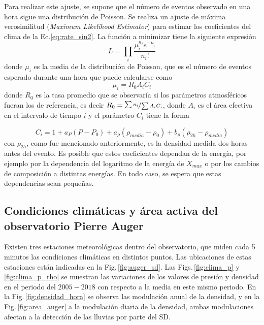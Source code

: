 Para realizar este ajuste, se supone que el número de eventos observado en una hora sigue una distribución de Poisson. Se realiza un ajuste de máxima verosimilitud (\emph{Maximum Likelihood Estimator}) para estimar los coeficientes del clima de la Ec.\ref{eq:rate_sin2}. La función a minimizar tiene la siguiente expresión 
\begin{equation}
	L=\prod_i\frac{\mu_i^{n_i} e^{-\mu_i}}{n_i!}
\end{equation}
donde $\mu_i$ es la media de la distribución de Poisson, que es el número de eventos esperado durante una hora que puede calcularse como
\begin{equation}
	\mu_i = R_0A_iC_i
\end{equation}
donde $R_0$ es la tasa promedio que se observaría si los parámetros atmosféricos fueran los de referencia, es decir $R_0=\nicefrac{\sum n_i}{\sum A_iC_i}$, donde $A_i$ es el área efectiva en el intervalo de tiempo $i$ y el parámetro $C_i$ tiene la forma

\begin{equation}
	C_i = 1+a_P(P-P_0) +a_{\rho}(\rho_{media}-\rho_0) + b_{\rho}(\rho_{2h}-\rho_{media}) 
\end{equation}
con $\rho_{2h}$, como fue mencionado anteriormente, es la densidad medida dos horas antes del evento. Es posible que estos coeficientes dependan de la energía, por ejemplo por la dependencia del logaritmo de la energía de $X_{max}$ o por los cambios de composición a distintas energías. En todo caso, se espera que estas dependencias sean pequeñas.

\subsection{Condiciones climáticas y área activa del observatorio Pierre Auger}

Existen tres estaciones meteorológicas dentro del observatorio, que miden cada 5 minutos las condiciones climáticas en distintos puntos. Las ubicaciones de estas estaciones están indicadas en la Fig.\,\ref{fig:auger_sd}. Las Figs.\,\ref{fig:clima_p} y \ref{fig:clima_p_rho} se muestran las variaciones de los valores de presión y densidad en el periodo del $2005-2018$ con respecto a la media en este mismo periodo. En la Fig.\,\ref{fig:densidad_hora} se observa las modulación anual de la densidad, y   en la Fig.\,\ref{fig:area_auger} a la modulación diaria de la densidad, ambas modulaciones afectan a la detección de las lluvias por parte del SD. 

